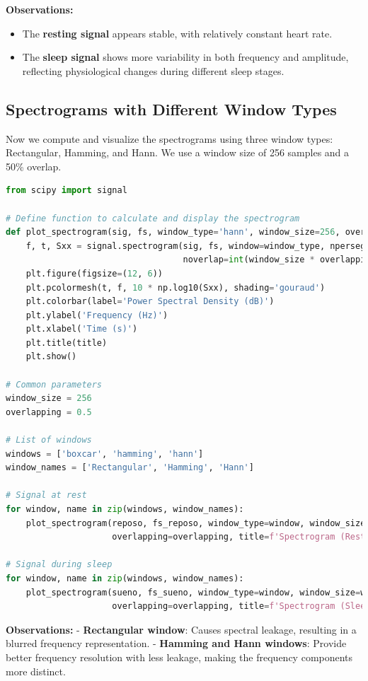 \documentclass[10pt]{article}
\theoremstyle{definition}
\theoremstyle{remark}
\theoremstyle{definition}
\numberwithin{equation}{prob}
\begin{document}
\textbf{Observations:}
\begin{itemize}
	\item The \textbf{resting signal} appears stable, with relatively constant heart rate.
	\item The \textbf{sleep signal} shows more variability in both frequency and amplitude, reflecting physiological changes during different sleep stages.
\end{itemize}
\subsection{Spectrograms with Different Window Types}

Now we compute and visualize the spectrograms using three window types: Rectangular, Hamming, and Hann. We use a window size of 256 samples and a 50\% overlap.

\begin{lstlisting}[language=Python]
from scipy import signal

# Define function to calculate and display the spectrogram
def plot_spectrogram(sig, fs, window_type='hann', window_size=256, overlapping=0.5, title=''):
    f, t, Sxx = signal.spectrogram(sig, fs, window=window_type, nperseg=window_size,
                                   noverlap=int(window_size * overlapping), scaling='spectrum')
    plt.figure(figsize=(12, 6))
    plt.pcolormesh(t, f, 10 * np.log10(Sxx), shading='gouraud')
    plt.colorbar(label='Power Spectral Density (dB)')
    plt.ylabel('Frequency (Hz)')
    plt.xlabel('Time (s)')
    plt.title(title)
    plt.show()

# Common parameters
window_size = 256
overlapping = 0.5

# List of windows
windows = ['boxcar', 'hamming', 'hann']
window_names = ['Rectangular', 'Hamming', 'Hann']

# Signal at rest
for window, name in zip(windows, window_names):
    plot_spectrogram(reposo, fs_reposo, window_type=window, window_size=window_size,
                     overlapping=overlapping, title=f'Spectrogram (Rest) - Window {name}')

# Signal during sleep
for window, name in zip(windows, window_names):
    plot_spectrogram(sueno, fs_sueno, window_type=window, window_size=window_size,
                     overlapping=overlapping, title=f'Spectrogram (Sleep) - Window {name}')
\end{lstlisting}

\textbf{Observations:}
- \textbf{Rectangular window}: Causes spectral leakage, resulting in a blurred frequency representation.
- \textbf{Hamming and Hann windows}: Provide better frequency resolution with less leakage, making the frequency components more distinct.
\end{document}
